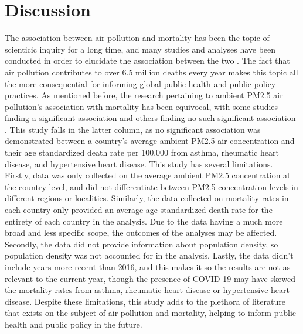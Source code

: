 \documentclass[12pt, letterpaper, twoside]{article}\usepackage[]{graphicx}\usepackage[]{xcolor}
\begin{document}
\section*{Discussion}
The association between air pollution and mortality has been the topic of
scienticic inquiry for a long time, and many studies and analyses have been
conducted in order to elucidate the association between the two
\citep{dockery1993association, sunyer1996air, jerrett2005spatial, analitis2006short}.
The fact that air pollution contributes to over 6.5 million deaths every year
\citep{fuller2022pollution} makes this topic all the more consequential for
informing global public health and public policy practices. As mentioned before,
the research pertaining to ambient PM2.5 air pollution's association with
mortality has been equivocal, with some studies finding a significant association
\citep{analitis2006short} and others finding no such significant association
\citep{khojasteh2021long}. This study falls in the latter column, as no
significant association was demonstrated between a country's average ambient
PM2.5 air concentration and their age standardized death rate per 100,000 from
asthma, rheumatic heart disease, and hypertensive heart disease.
This study has several limitations. Firstly, data was only collected on the
average ambient PM2.5 concentration at the country level, and did not
differentiate between PM2.5 concentration levels in different regions or
localities. Similarly, the data collected on mortality rates in each country
only provided an average age standardized death rate for the entirety of each
country in the analysis. Due to the data having a much more broad and less
specific scope, the outcomes of the analyses may be affected. Secondly, the data
did not provide information about population density, so population density
was not accounted for in the analysis. Lastly, the data didn't include years
more recent than 2016, and this makes it so the results are not as relevant to
the current year, though the presence of COVID-19 may have skewed the mortality
rates from asthma, rheumatic heart disease or hypertensive heart disease. Despite
these limitations, this study adds to the plethora of literature that exists on
the subject of air pollution and mortality, helping to inform public health and
public policy in the future.



\end{document}
